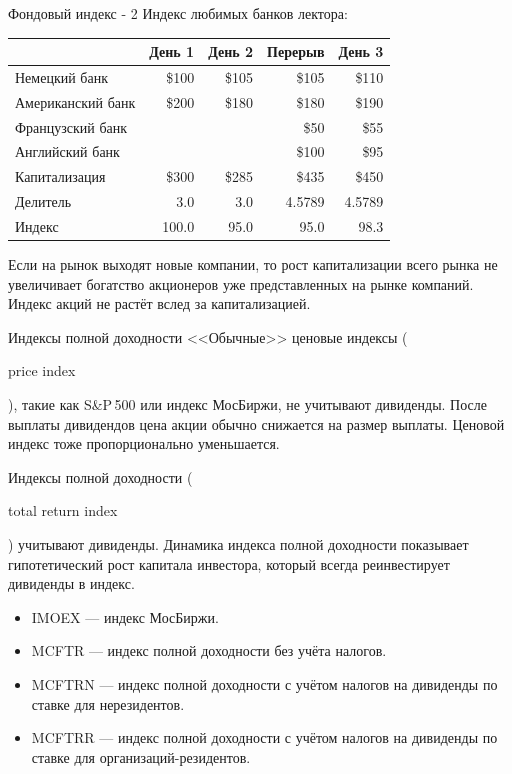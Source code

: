 \documentclass{beamer}
\newcommand{\en}[1]{\begin{otherlanguage}{english}#1\end{otherlanguage}}
\begin{document}
\begin{frame}{Фондовый индекс - 2}
\justify
Индекс любимых банков лектора:

\justify
\centering
\begin{tabular}{l|r|r|r|r}
                  & День 1 & День 2 & Перерыв & День 3 \\ \hline
Немецкий банк     & \$100  & \$105  & \$105   & \$110 \\
Американский банк & \$200  & \$180  & \$180   & \$190 \\
Французский банк  &        &        & \$50    & \$55  \\
Английский банк   &        &        & \$100   & \$95  \\
Капитализация     & \$300  & \$285  & \$435   & \$450 \\
Делитель          & 3.0    & 3.0    & 4.5789  & 4.5789 \\ \hline
Индекс            & 100.0  & 95.0   & 95.0    & 98.3
\end{tabular}

\justify
Если на рынок выходят новые компании, то рост капитализации всего рынка не 
увеличивает богатство акционеров уже представленных на рынке компаний. Индекс 
акций не растёт вслед за капитализацией.
\end{frame}



\begin{frame}{Индексы полной доходности}
\justify
<<Обычные>> ценовые индексы (\en{price index}), такие как S\&P\,500 или индекс 
МосБиржи, не учитывают дивиденды. После выплаты дивидендов цена акции обычно 
снижается на размер выплаты. Ценовой индекс тоже пропорционально уменьшается.

\justify
Индексы полной доходности (\en{total return index}) учитывают дивиденды. 
Динамика индекса полной доходности показывает гипотетический рост капитала 
инвестора, который всегда реинвестирует дивиденды в индекс.

\justify
\begin{itemize}
\item IMOEX --- индекс МосБиржи.
\item MCFTR --- индекс полной доходности без учёта налогов.
\item MCFTRN --- индекс полной доходности с учётом налогов на дивиденды по 
ставке для нерезидентов.
\item MCFTRR --- индекс полной доходности с учётом налогов на дивиденды по
ставке для организаций-резидентов.
\end{itemize}
\end{frame}
\end{document}

